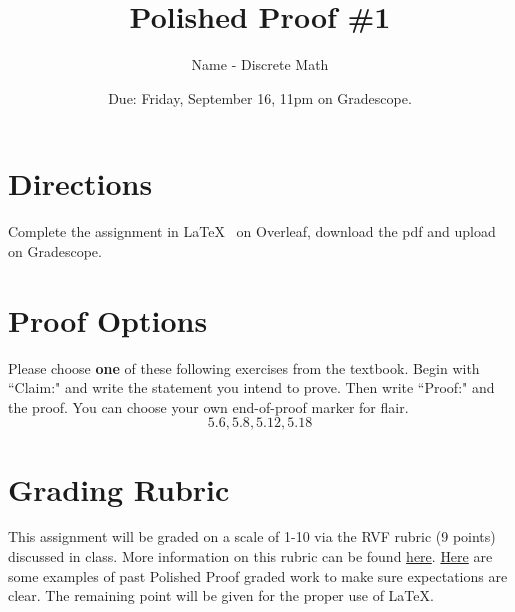 \documentclass[10pt, leqno]{article}
\title{Polished Proof \#1}
\author{Name - Discrete Math}
\date{Due: Friday, September 16, 11pm on Gradescope.}
\begin{document}
	
\maketitle
	
\section*{Directions}
	
Complete the assignment in \LaTeX ~ on Overleaf, download the pdf and upload on Gradescope. 

	
\section*{Proof Options}
	
Please choose \textbf{one} of these following exercises from the textbook. Begin with ``Claim:" and write the statement you intend to prove. Then write ``Proof:" and the proof. You can choose your own end-of-proof marker for flair. 	
$$ 	5.6, 5.8, 5.12, 5.18 $$ 
	
	
\section*{Grading Rubric}
This assignment will be graded on a scale of 1-10 via the RVF rubric (9 points) discussed in class. More information on this rubric can be found \href{https://drive.google.com/file/d/1P0OBjw-GkX64uCpYcqYmXARapf9MwaiI/view?usp=sharing}{here}. \href{https://drive.google.com/file/d/1KAFQ7GBFpfUkyTBRZ30h5o6nXWwYDSML/view?usp=sharing}{Here} are some examples of past Polished Proof graded work to make sure expectations are clear. The remaining point will be given for the proper use of \LaTeX.

\newpage

	
\end{document}
